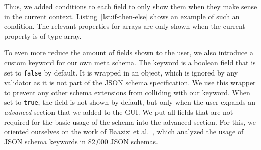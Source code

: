 Thus, we added  conditions to each field to only show them when they make sense in the current context.
Listing~\ref{lst:if-then-else} shows an example of such an  condition.
The relevant properties for arrays are only shown when the current property is of type array.

To even more reduce the amount of fields shown to the user, we also introduce a custom keyword for our own meta schema.
The keyword  is a boolean field that is set to \texttt{false} by default.
It is wrapped in an  object, which is ignored by any validator as it is not part of the JSON schema specification.
We use this wrapper to prevent any other schema extensions from colliding with our keyword.
When set to \texttt{true}, the field is not shown by default, but only when the user expands an \textit{advanced} section that we added to the GUI.
We put all fields that are not required for the basic usage of the schema into the advanced section.
For this, we oriented ourselves on the work of Baazizi et al.~\cite{baazizi2021empirical}, which analyzed the usage of JSON schema keywords in 82,000 JSON schemas.




